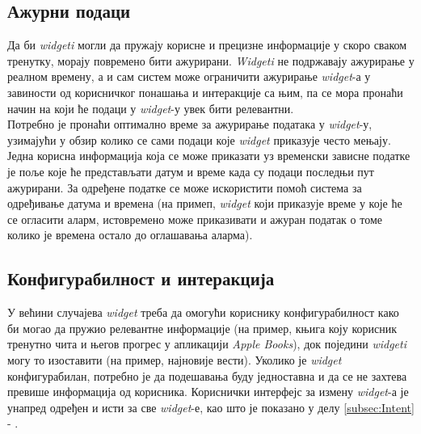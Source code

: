 \documentclass[12pt,oneside]{memoir}
\begin{document}
\subsection{Ажурни подаци}
\indent Да би \textit{widgeti} могли да пружају корисне и прецизне информације у скоро сваком тренутку, морају повремено бити ажурирани. \textit{Widgeti} не подржавају ажурирање у реалном времену, а и сам систем може ограничити ажурирање \textit{widget}-а у завиности од корисничког понашања и интеракције са њим, па се мора пронаћи начин на који ће подаци у \textit{widget}-у увек бити релевантни. 
\\
\indent Потребно је пронаћи оптимално време за ажурирање података у \textit{widget}-у, узимајући у обзир колико се сами подаци које \textit{widget} приказује често мењају. Једна корисна информација која се може приказати уз временски зависне податке је поље које ће представљати датум и време када су подаци последњи пут ажурирани. За одређене податке се може искористити помоћ система за одређивање датума и времена (на примеп, \textit{widget} који приказује време у које ће се огласити аларм, истовремено може приказивати и ажуран податак о томе колико је времена остало до оглашавања аларма).

\subsection{Конфигурабилност и интеракција}
\indent У већини случајева \textit{widget} треба да омогући кориснику конфигурабилност како би могао да пружио релевантне информације (на пример, књига коју корисник тренутно чита и његов прогрес у апликацији \textit{Apple Books}), док поједини \textit{widgeti} могу то изоставити (на пример, најновије вести). Уколико је \textit{widget} конфигурабилан, потребно је да подешавања буду једноставна и да се не захтева превише информација од корисника. Кориснички интерфејс за измену \textit{widget}-а је унапред одређен и исти за све \textit{widget}-е, као што је показано у делу \ref{subsec:Intent} - .
\end{document}
